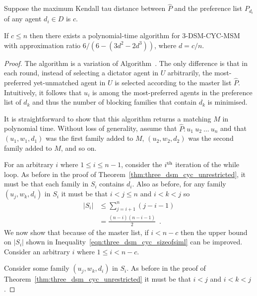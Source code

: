 Suppose the maximum Kendall tau distance between $\hat{P}$ and the preference list $P_{d_i}$ of any agent $d_i \in D$ is $c$.  

\begin{thm}
\label{thm:three_dsm_cyc_ml}
If $c \leq n$ then there exists a polynomial-time algorithm for 3-DSM-CYC-MSM with approximation ratio ${6}/{(6 - (3d^2 - 2d^3))}$, where $d = c/n$.
\end{thm}
\begin{proof}
The algorithm is a variation of Algorithm~. The only difference is that in each round, instead of selecting a dictator agent in $U$ arbitrarily, the most-preferred yet-unmatched agent in $U$ is selected according to the master list $\hat{P}$. Intuitively, it follows that $u_i$ is among the most-preferred agents in the preference list of $d_k$ and thus the number of blocking families that contain $d_k$ is minimised. 

It is straightforward to show that this algorithm returns a matching $M$ in polynomial time. Without loss of generality, assume that $\hat{P} : u_1\ u_2\ \dots\ u_n$ and that $( u_1, w_1, d_1 )$ was the first family added to $M$, $( u_2, w_2, d_2 )$ was the second family added to $M$, and so on. 

For an arbitrary $i$ where $1 \leq i \leq n - 1$, consider the $i\textsuperscript{th}$ iteration of the while loop. As before in the proof of Theorem~\ref{thm:three_dsm_cyc_unrestricted}, it must be that each family in $S_i$ contains $d_i$. Also as before, for any family $( u_j, w_k, d_i )$ in $S_i$ it must be that $i < j \leq n$ and $i < k < j$ so
\begin{align}
    |S_i| &\leq \sum\limits_{j=i+1}^{n} (j - i - 1)\nonumber\\
    &= \frac{(n-i)(n-i-1)}{2}\label{eqn:three_dsm_cyc_sizeofsiml}\enspace.
\end{align}
We now show that because of the master list, if $i < n - c$ then the upper bound on $|S_{i}|$ shown in Inequality~\ref{eqn:three_dsm_cyc_sizeofsiml} can be improved. Consider an arbitrary $i$ where $1 \leq i < n - c$.

Consider some family $( u_j, w_k, d_{i} )$ in $S_{i}$. As before in the proof of Theorem~\ref{thm:three_dsm_cyc_unrestricted} it must be that $i < j$ and $i < k < j$.


\end{proof}
